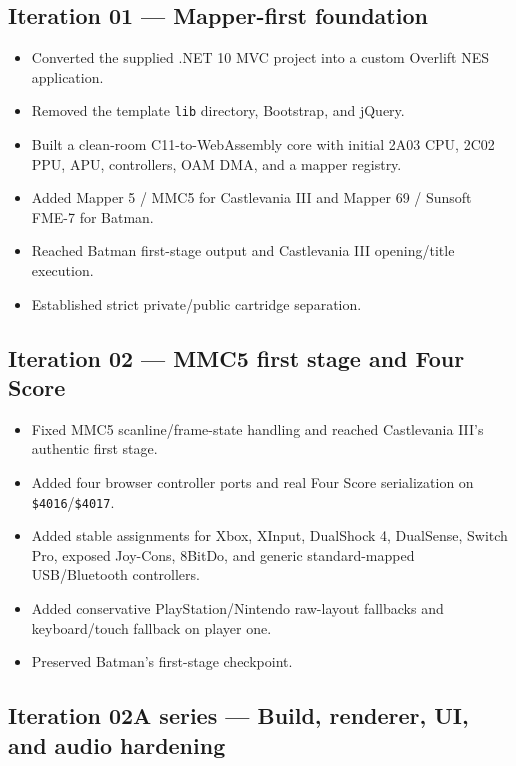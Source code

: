 \documentclass[10pt,letterpaper]{article}
\newcommand{\code}[1]{\texttt{\small #1}}
\begin{document}
\subsection{Iteration 01 --- Mapper-first foundation}
\begin{itemize}
\item Converted the supplied .NET 10 MVC project into a custom Overlift NES application.
\item Removed the template \code{lib} directory, Bootstrap, and jQuery.
\item Built a clean-room C11-to-WebAssembly core with initial 2A03 CPU, 2C02 PPU, APU, controllers, OAM DMA, and a mapper registry.
\item Added Mapper 5 / MMC5 for Castlevania III and Mapper 69 / Sunsoft FME-7 for Batman.
\item Reached Batman first-stage output and Castlevania III opening/title execution.
\item Established strict private/public cartridge separation.
\end{itemize}

\subsection{Iteration 02 --- MMC5 first stage and Four Score}
\begin{itemize}
\item Fixed MMC5 scanline/frame-state handling and reached Castlevania III's authentic first stage.
\item Added four browser controller ports and real Four Score serialization on \code{\$4016}/\code{\$4017}.
\item Added stable assignments for Xbox, XInput, DualShock 4, DualSense, Switch Pro, exposed Joy-Cons, 8BitDo, and generic standard-mapped USB/Bluetooth controllers.
\item Added conservative PlayStation/Nintendo raw-layout fallbacks and keyboard/touch fallback on player one.
\item Preserved Batman's first-stage checkpoint.
\end{itemize}

\subsection{Iteration 02A series --- Build, renderer, UI, and audio hardening}
\end{document}
